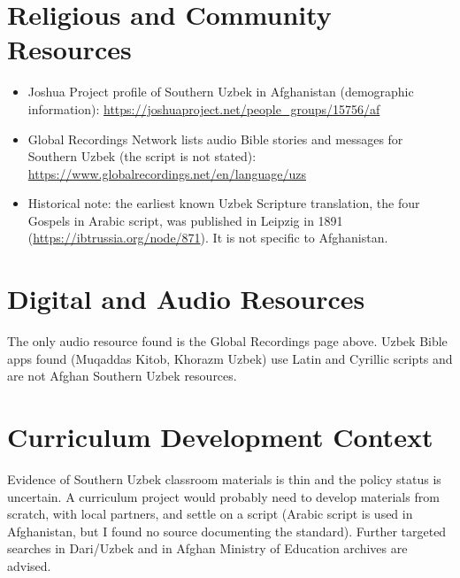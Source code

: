 \documentclass[12pt]{article}
\begin{document}
\section{Religious and Community Resources}
\begin{itemize}
\item Joshua Project profile of Southern Uzbek in Afghanistan (demographic information): \url{https://joshuaproject.net/people_groups/15756/af}
\item Global Recordings Network lists audio Bible stories and messages for Southern Uzbek (the script is not stated): \url{https://www.globalrecordings.net/en/language/uzs}
\item Historical note: the earliest known Uzbek Scripture translation, the four Gospels in Arabic script, was published in Leipzig in 1891 (\url{https://ibtrussia.org/node/871}). It is not specific to Afghanistan.
\end{itemize}

\section{Digital and Audio Resources}
The only audio resource found is the Global Recordings page above. Uzbek Bible apps found (Muqaddas Kitob, Khorazm Uzbek) use Latin and Cyrillic scripts and are not Afghan Southern Uzbek resources.

\section{Curriculum Development Context}
Evidence of Southern Uzbek classroom materials is thin and the policy status is uncertain. A curriculum project would probably need to develop materials from scratch, with local partners, and settle on a script (Arabic script is used in Afghanistan, but I found no source documenting the standard). Further targeted searches in Dari/Uzbek and in Afghan Ministry of Education archives are advised.
\end{document}
